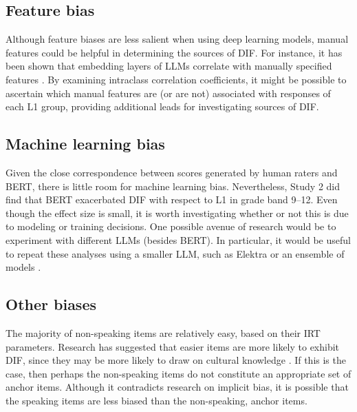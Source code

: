 \documentclass [PhD] {uclathes}
\begin{document}
\subsection{Feature bias}

Although feature biases are less salient when using deep learning models, manual features could be helpful in determining the sources of DIF. For instance, it has been shown that embedding layers of LLMs correlate with manually specified features \citep{ormerod2022mapping}. By examining intraclass correlation coefficients, it might be possible to ascertain which manual features are (or are not) associated with responses of each L1 group, providing additional leads for investigating sources of DIF. 

\subsection{Machine learning bias}

Given the close correspondence between scores generated by human raters and BERT, there is little room for machine learning bias. Nevertheless, Study 2 did find that BERT exacerbated DIF with respect to L1 in grade band 9–12. Even though the effect size is small, it is worth investigating whether or not this is due to modeling or training decisions. One possible avenue of research would be to experiment with different LLMs (besides BERT). In particular, it would be useful to repeat these analyses using a smaller LLM, such as Elektra or an ensemble of models \citep{ormerod2022short}. 

\subsection{Other biases}

The majority of non-speaking items are relatively easy, based on their IRT parameters. Research has suggested that easier items are more likely to exhibit DIF, since they may be more likely to draw on cultural knowledge \citep{santelices2010unfair}. If this is the case, then perhaps the non-speaking items do not constitute an appropriate set of anchor items. Although it contradicts research on implicit bias, it is possible that the speaking items are less biased than the non-speaking, anchor items. 
\end{document}
